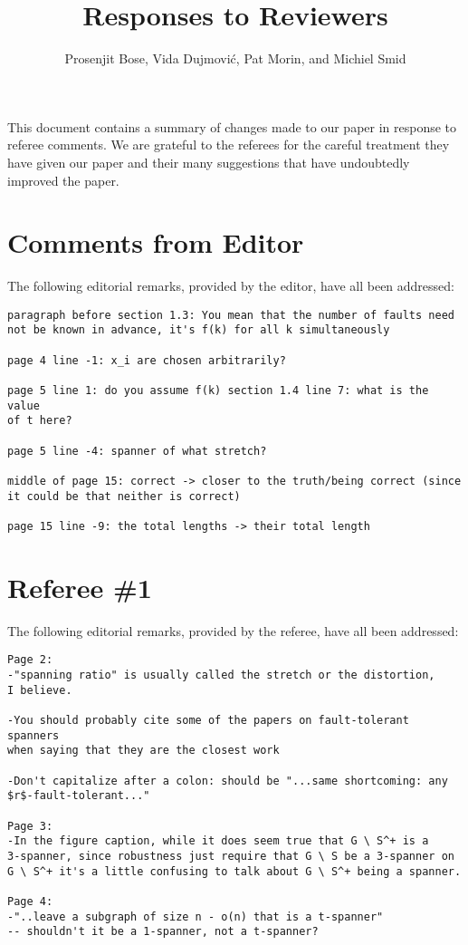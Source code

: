 \documentclass{patmorin}
\title{Responses to Reviewers}
\author{Prosenjit Bose, Vida Dujmovi\'c, Pat Morin, and Michiel Smid}
\begin{document}
\maketitle

This document contains a summary of changes made to our paper in response
to referee comments.  We are grateful to the referees for the careful
treatment they have given our paper and their many suggestions that have
undoubtedly improved the paper.

\section{Comments from Editor}

The following editorial remarks, provided by the editor, have all been
addressed:

\begin{Verbatim}[frame=single]
paragraph before section 1.3: You mean that the number of faults need
not be known in advance, it's f(k) for all k simultaneously

page 4 line -1: x_i are chosen arbitrarily?

page 5 line 1: do you assume f(k) section 1.4 line 7: what is the value
of t here?

page 5 line -4: spanner of what stretch?

middle of page 15: correct -> closer to the truth/being correct (since
it could be that neither is correct)

page 15 line -9: the total lengths -> their total length
\end{Verbatim}

\section{Referee \#1}

The following editorial remarks, provided by the referee, have all been
addressed:

\begin{Verbatim}[frame=single]
Page 2:
-"spanning ratio" is usually called the stretch or the distortion,
I believe.

-You should probably cite some of the papers on fault-tolerant spanners
when saying that they are the closest work

-Don't capitalize after a colon: should be "...same shortcoming: any
$r$-fault-tolerant..."

Page 3:
-In the figure caption, while it does seem true that G \ S^+ is a
3-spanner, since robustness just require that G \ S be a 3-spanner on 
G \ S^+ it's a little confusing to talk about G \ S^+ being a spanner.

Page 4:
-"..leave a subgraph of size n - o(n) that is a t-spanner" 
-- shouldn't it be a 1-spanner, not a t-spanner?
\end{Verbatim}
\end{document}
